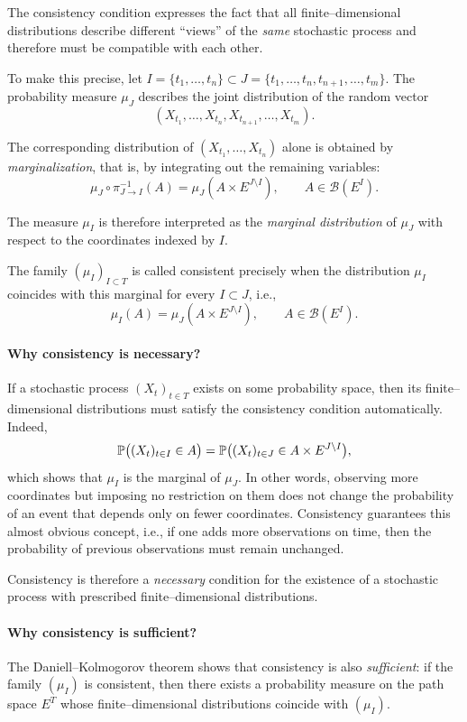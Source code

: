 The consistency condition expresses the fact that all finite--dimensional distributions
describe different ``views'' of the \emph{same} stochastic process and therefore must be
compatible with each other.

To make this precise, let $I = \{t_1,\dots,t_n\} \subset J = \{t_1,\dots,t_n,t_{n+1},\dots,t_m\}$.
The probability measure $\mu_J$ describes the joint distribution of the random vector
\[
(X_{t_1},\dots,X_{t_n},X_{t_{n+1}},\dots,X_{t_m}).
\]

The corresponding distribution of $(X_{t_1},\dots,X_{t_n})$ alone is obtained by
\emph{marginalization}, that is, by integrating out the remaining variables:
\[
\mu_J \circ \pi_{J\to I}^{-1}(A)
=
\mu_J(A \times E^{J\setminus I}),
\qquad
A \in \mathcal{B}(E^I).
\]

\begin{remark}
The measure $\mu_I$ is therefore interpreted as the \emph{marginal distribution} of $\mu_J$
with respect to the coordinates indexed by $I$.
\end{remark}

The family $(\mu_I)_{I \subset T}$ is called consistent precisely when the distribution
$\mu_I$ coincides with this marginal for every $I \subset J$, i.e.,
\[
\mu_I(A)
=
\mu_J(A \times E^{J\setminus I}),
\qquad
A \in \mathcal{B}(E^I).
\]

\paragraph{Why consistency is necessary?}
If a stochastic process $(X_t)_{t\in T}$ exists on some probability space, then its
finite--dimensional distributions must satisfy the consistency condition automatically.
Indeed,
\[
\mathbb{P}\big((X_t)_{t\in I} \in A\big)
=
\mathbb{P}\big((X_t)_{t\in J} \in A \times E^{J\setminus I}\big),
\]
which shows that $\mu_I$ is the marginal of $\mu_J$. In other words, observing more coordinates but imposing no restriction on them does not change the probability of an event that depends only on fewer coordinates. Consistency guarantees this almost obvious concept, i.e., if one adds more observations on time, then the probability of previous observations must remain unchanged.  

Consistency is therefore a \emph{necessary} condition for the existence of a stochastic
process with prescribed finite--dimensional distributions.

\paragraph{Why consistency is sufficient?}
The Daniell--Kolmogorov theorem shows that consistency is also \emph{sufficient}:
if the family $(\mu_I)$ is consistent, then there exists a probability measure on the
path space $E^T$ whose finite--dimensional distributions coincide with $(\mu_I)$.

